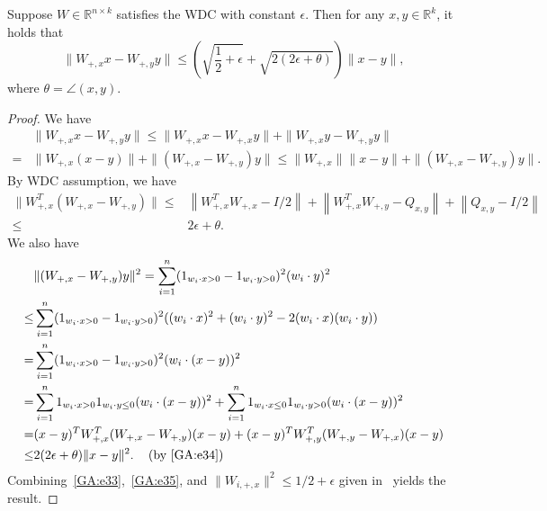 \begin{lemma} \label{GA:le20}
Suppose $W \in \mathbb{R}^{n \times k}$ satisfies the WDC with constant $\epsilon$. Then for any $x, y \in \mathbb{R}^k$, it holds that
\begin{equation*}
\|W_{+, x} x - W_{+, y} y\| \leq \left( \sqrt{\frac{1}{2} + \epsilon} + \sqrt{2(2\epsilon + \theta)} \right) \|x - y\|,
\end{equation*}
where $\theta = \angle(x, y)$.
\end{lemma}
\begin{proof}
We have
\begin{align}
&\|W_{+, x} x - W_{+, y} y\| \leq \|W_{+, x} x - W_{+, x} y\| + \|W_{+, x} y - W_{+, y} y\| \nonumber \\
=& \|W_{+, x} (x - y)\| + \|(W_{+, x} - W_{+, y}) y\| \leq \|W_{+, x}\| \|x - y\| + \|(W_{+, x} - W_{+, y}) y\|. \label{GA:e33}
\end{align}
By WDC assumption, we have
\begin{align}
\|W_{+, x}^T (W_{+, x} - W_{+, y})\| \leq& \left\|W_{+, x}^T W_{+, x} - I  / 2\right\| + \left\|W_{+, x}^T W_{+, y} - Q_{x, y}\right\| + \left\| Q_{x, y} -  I / 2 \right\| \nonumber \\
\leq& 2 \epsilon + \theta. \label{GA:e34}
\end{align}
We also have
\begin{align}
&\|(W_{+, x} - W_{+, y}) y\|^2 = \sum_{i = 1}^n (1_{w_i \cdot x > 0} - 1_{w_i \cdot y > 0})^2 (w_i \cdot y)^2 \nonumber \\
\leq& \sum_{i = 1}^n (1_{w_i \cdot x > 0} - 1_{w_i \cdot y > 0})^2 ((w_i \cdot x)^2 + (w_i \cdot y)^2 - 2 (w_i \cdot x) (w_i \cdot y) ) \nonumber \\
=& \sum_{i = 1}^n (1_{w_i \cdot x > 0} - 1_{w_i \cdot y > 0})^2 (w_i \cdot (x - y) )^2 \nonumber \\
=& \sum_{i = 1}^n 1_{w_i \cdot x > 0} 1_{w_i \cdot y \leq 0} (w_i \cdot (x - y))^2 + \sum_{i = 1}^n 1_{w_i \cdot x \leq 0} 1_{w_i \cdot y > 0} (w_i \cdot(x - y))^2 \nonumber \\
=& (x - y)^T W_{+, x}^T (W_{+, x} - W_{+, y}) (x - y) + (x - y)^T W_{+, y}^T (W_{+, y} - W_{+, x}) (x - y) \nonumber \\
\leq& 2 (2 \epsilon + \theta) \|x - y\|^2. \;\;\; \hbox{ (by~\eqref{GA:e34})} \label{GA:e35}
\end{align}
Combining~\eqref{GA:e33},~\eqref{GA:e35}, and $\|W_{i, +, x}\|^2 \leq 1/2 + \epsilon$ given in~\cite[(10)]{HV17} yields the result.
\end{proof}

